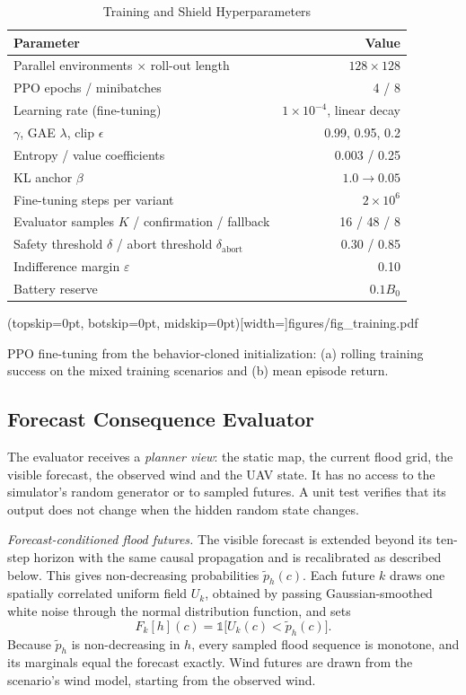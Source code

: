\documentclass{ieeeaccess}
\newcommand{\widecap}[1]{\parbox[t]{0.89\textwidth}{\raggedright #1}}
\begin{document}
\begin{table}[t]
\caption{Training and Shield Hyperparameters}
\label{tab:hyper}
\setlength{\tabcolsep}{4pt}
\begin{tabular}{@{}lr@{}}
\toprule
Parameter & Value \\
\midrule
Parallel environments $\times$ roll-out length & $128\times128$ \\
PPO epochs / minibatches & 4 / 8 \\
Learning rate (fine-tuning) & $1\times10^{-4}$, linear decay \\
$\gamma$, GAE $\lambda$, clip $\epsilon$ & 0.99, 0.95, 0.2 \\
Entropy / value coefficients & 0.003 / 0.25 \\
KL anchor $\beta$ & $1.0\rightarrow0.05$ \\
Fine-tuning steps per variant & $2\times10^{6}$ \\
Evaluator samples $K$ / confirmation / fallback & 16 / 48 / 8 \\
Safety threshold $\delta$ / abort threshold $\delta_{\mathrm{abort}}$ & 0.30 / 0.85 \\
Indifference margin $\varepsilon$ & 0.10 \\
Battery reserve & $0.1B_0$ \\
\bottomrule
\end{tabular}
\end{table}

\Figure[t!](topskip=0pt, botskip=0pt, midskip=0pt)[width=\textwidth]{figures/fig_training.pdf}
{\widecap{PPO fine-tuning from the behavior-cloned initialization: (a) rolling training success on the mixed training scenarios and (b) mean episode return.}\label{fig:training}}

\subsection{Forecast Consequence Evaluator}
The evaluator receives a \emph{planner view}: the static map, the current flood grid, the visible forecast, the observed wind and the UAV state. It has no access to the simulator's random generator or to sampled futures. A unit test verifies that its output does not change when the hidden random state changes.

\emph{Forecast-conditioned flood futures.} The visible forecast is extended beyond its ten-step horizon with the same causal propagation and is recalibrated as described below. This gives non-decreasing probabilities $\tilde p_h(c)$. Each future $k$ draws one spatially correlated uniform field $U_k$, obtained by passing Gaussian-smoothed white noise through the normal distribution function, and sets
\begin{equation}
F_k[h](c)=\mathbb{1}\big[U_k(c)<\tilde p_h(c)\big].
\label{eq:threshold}
\end{equation}
Because $\tilde p_h$ is non-decreasing in $h$, every sampled flood sequence is monotone, and its marginals equal the forecast exactly. Wind futures are drawn from the scenario's wind model, starting from the observed wind.
\end{document}
